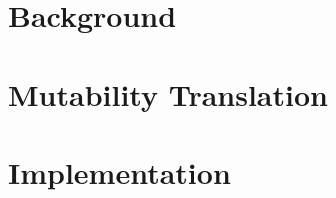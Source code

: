 
\tableofcontents


\chapter{Background}



\chapter{Mutability Translation}
\label{translation}



\chapter{Implementation}
\label{implementation}

